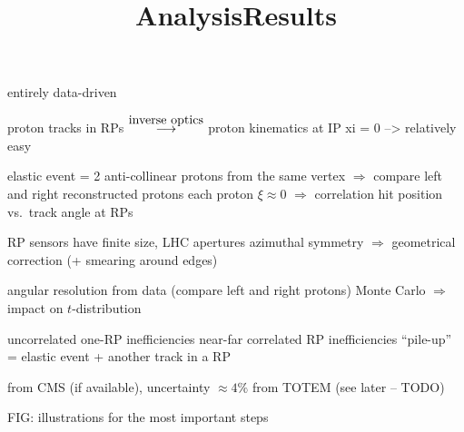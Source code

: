 
\newpage %
\title{Analysis}

\> entirely data-driven

{

\noindent{}\cFg

\> proton tracks in RPs $\mathop{\longrightarrow}\limits^{\hbox{inverse optics}}$ proton kinematics at IP
\> xi  = 0 --> relatively easy

\vfil
\noindent{}\cFg

\> elastic event = 2 anti-collinear protons from the same vertex $\Rightarrow$ compare left and right reconstructed protons
\> each proton $\xi \approx 0$ $\Rightarrow$ correlation hit position vs.~track angle at RPs

\vfil
\noindent{}\cFg

\> RP sensors have finite size, LHC apertures
\> azimuthal symmetry $\Rightarrow$ geometrical correction (+ smearing around edges)

\vfil
\noindent{}\cFg

\> angular resolution from data (compare left and right protons) 
\> Monte Carlo $\Rightarrow$ impact on $t$-distribution

\vfil
\noindent{}\cFg

\> uncorrelated one-RP inefficiencies
\> near-far correlated RP inefficiencies
\> ``pile-up'' = elastic event + another track in a RP

\vfil
\noindent{}\cFg

\> from CMS (if available), uncertainty $\approx 4\%$
\> from TOTEM (see later -- TODO)
}

\> FIG: illustrations for the most important steps

\newpage %
\title{Results}

\centerline{}

\vfil



